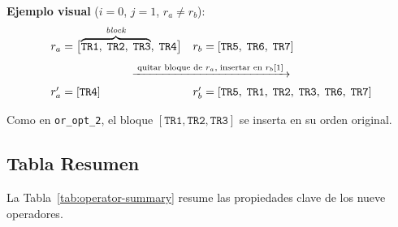 \noindent\textbf{Ejemplo visual} ($i=0$, $j=1$, $r_a \neq r_b$):
\[
    \begin{array}{ll}
        r_a = \bigl[\overbrace{\mathtt{TR1},\;\mathtt{TR2},\;\mathtt{TR3}}^{\mathit{block}},\;
                    \mathtt{TR4}\bigr]
        &
        r_b = [\mathtt{TR5},\;\mathtt{TR6},\;\mathtt{TR7}] \\[8pt]
        \multicolumn{2}{c}{\xrightarrow{\;\text{quitar bloque de }r_a,\;\text{insertar en }r_b[1]\;}} \\[4pt]
        r'_a = [\mathtt{TR4}]
        &
        r'_b = [\mathtt{TR5},\;\mathtt{TR1},\;\mathtt{TR2},\;\mathtt{TR3},\;\mathtt{TR6},\;\mathtt{TR7}]
    \end{array}
\]

\noindent Como en \texttt{or\_opt\_2}, el bloque $[\mathtt{TR1}, \mathtt{TR2}, \mathtt{TR3}]$
se inserta en su orden original.

\subsection{Tabla Resumen}
\label{subsec:operator-summary}

La Tabla~\ref{tab:operator-summary} resume las propiedades clave de los
nueve operadores.

